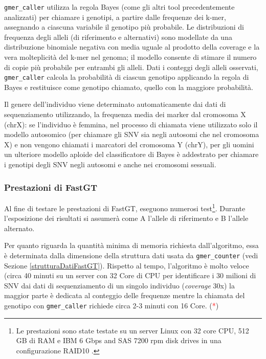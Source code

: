 \documentclass[../main.tex]{subfiles}
\begin{document}
\texttt{gmer\_caller} utilizza la regola Bayes (come gli altri tool precedentemente analizzati) per chiamare i genotipi, a partire dalle frequenze dei k-mer, assegnando a ciascuna variabile il genotipo più probabile. Le distribuzioni di frequenza degli alleli (di riferimento e alternativi) sono modellate da una distribuzione binomiale negativa con media uguale al prodotto della coverage e la vera molteplicità del k-mer nel genoma; il modello consente di stimare il numero di copie più probabile per entrambi gli alleli. Dati i conteggi degli alleli osservati, \texttt{gmer\_caller} calcola la probabilità di ciascun genotipo applicando la regola di Bayes e restituisce come genotipo chiamato, quello con la maggiore probabilità. 

Il genere dell'individuo viene determinato automaticamente dai dati di sequenziamento utilizzando, la frequenza media dei marker dal cromosoma X (chrX): se l'individuo è femmina, nel processo di chiamata viene utilizzato solo il modello autosomico (per chiamare gli SNV sia negli autosomi che nel cromosoma X) e non vengono chiamati i marcatori del cromosoma Y (chrY), per gli uomini un ulteriore modello aploide del classificatore di Bayes è addestrato per chiamare i genotipi degli SNV negli autosomi e anche nei cromosomi sessuali.


\subsubsection{Prestazioni di FastGT}

Al fine di testare le prestazioni di FastGT, \cite{pajuste2017fastgt} eseguono numerosi test\footnote{Le prestazioni sono state testate su un server Linux con 32 core CPU, 512 GB di RAM e IBM 6 Gbps and SAS 7200 rpm disk drives in una configurazione RAID10 \cite{pajuste2017fastgt}.}. Durante l'esposizione dei risultati si assumerà come A l'allele di riferimento e B l'allele alternato.

Per quanto riguarda la quantità minima di memoria richiesta dall'algoritmo, essa è determinata dalla dimensione della struttura dati usata da \texttt{gmer\_counter} (vedi Sezione \ref{strutturaDatiFastGT}). Rispetto al tempo, l'algoritmo è molto veloce (circa 40 minuti su un server con 32 Core di CPU per identificare i 30 milioni di SNV dai dati di sequenziamento di un singolo individuo (\textit{coverage} 30x) la maggior parte è dedicata al conteggio delle frequenze mentre la chiamata del genotipo con \texttt{gmer\_caller} richiede circa 2-3 minuti con 16 Core. (\textcolor{red}{*})
\end{document}
